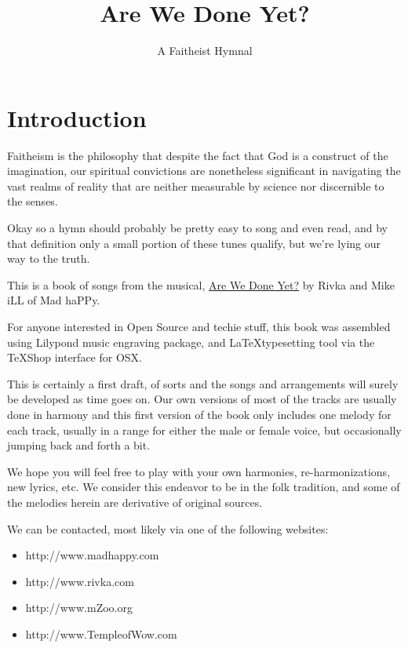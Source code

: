 \documentclass[11pt, twoside]{book}   	%
\title{Are We Done Yet?}
\author{A Faitheist Hymnal}
\date{}							%
\begin{document}

\maketitle
\tableofcontents
\chapter{Introduction}

Faitheism is the philosophy that despite the fact that God is a construct of the imagination, our spiritual convictions are nonetheless significant in navigating the vast realms of reality that are neither measurable by science nor discernible to the senses.

Okay so a hymn should probably be pretty easy to song and even read, and by that definition only a small portion of these tunes qualify, but we're lying our way to the truth.

This is a book of songs from the musical, \underline{Are We Done Yet?} by Rivka and Mike iLL of Mad haPPy.

For anyone interested in Open Source and techie stuff, this book was assembled using Lilypond music engraving package, and \LaTeX  typesetting tool via the TeXShop interface for OSX.

This is certainly a first draft, of sorts and the songs and arrangements will surely be developed as time goes on. Our own versions of most of the tracks are usually done in harmony and this first version of the book only includes one melody for each track, usually in a range for either the male or female voice, but occasionally jumping back and forth a bit.

We hope you will feel free to play with your own harmonies, re-harmonizations, new lyrics, etc. We consider this endeavor to be in the folk tradition, and some of the melodies herein are derivative of original sources.

We can be contacted, most likely via one of the following websites: \\
\begin{itemize}
\item http://www.madhappy.com 
\item http://www.rivka.com
\item http://www.mZoo.org
\item http://www.TempleofWow.com
\end{itemize}
\pagebreak{}
\end{document}
